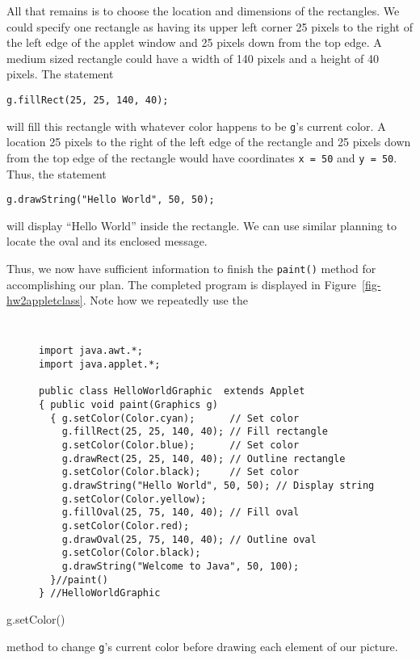 All that remains is to choose the location and dimensions of the
rectangles.  We could specify one rectangle as having its upper left
corner 25 pixels to the right of the left edge of the applet window
and 25 pixels down from the top edge.  A medium sized rectangle could
have a width of 140 pixels and a height of 40 pixels.  The statement
\begin{jjjlisting}
\begin{lstlisting}
g.fillRect(25, 25, 140, 40);
\end{lstlisting}
\end{jjjlisting}

\noindent will fill this rectangle with whatever color happens to
be {\tt g}'s current color.  A location 25 pixels to the right of the
left edge of the rectangle and 25 pixels down from the top 
edge of the rectangle would have coordinates \mbox{\tt x = 50} and
\mbox{\tt y = 50}.  Thus, the statement

\begin{jjjlisting}
\begin{lstlisting}
g.drawString("Hello World", 50, 50);
\end{lstlisting}
\end{jjjlisting}

\noindent will display ``Hello World'' inside the rectangle. We can
use similar planning to locate the oval and its enclosed message.

Thus, we now have sufficient information to finish the {\tt paint()}
method for accomplishing our plan.  The completed program is displayed
in Figure~\ref{fig-hw2appletclass}. Note how we repeatedly use the {\tt
\begin{figure}[!htb]
\jjjprogstart
\begin{jjjlisting}
\begin{lstlisting}
import java.awt.*;
import java.applet.*;

public class HelloWorldGraphic  extends Applet 
{ public void paint(Graphics g) 
  { g.setColor(Color.cyan);      // Set color
    g.fillRect(25, 25, 140, 40); // Fill rectangle
    g.setColor(Color.blue);      // Set color
    g.drawRect(25, 25, 140, 40); // Outline rectangle
    g.setColor(Color.black);     // Set color
    g.drawString("Hello World", 50, 50); // Display string
    g.setColor(Color.yellow);          
    g.fillOval(25, 75, 140, 40); // Fill oval
    g.setColor(Color.red);
    g.drawOval(25, 75, 140, 40); // Outline oval
    g.setColor(Color.black);
    g.drawString("Welcome to Java", 50, 100);
  }//paint()
} //HelloWorldGraphic
\end{lstlisting}
\end{jjjlisting}
\end{figure}
g.setColor()} method to change {\tt g}'s current color before drawing
each element of our picture. 

